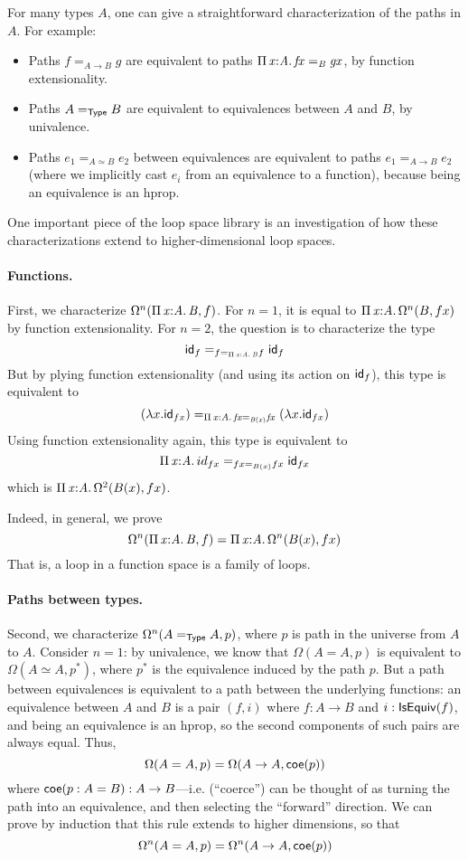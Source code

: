 For many types $A$, one can give a straightforward characterization of
the paths in $A$.  For example:
\begin{itemize}
\item Paths $f =_{A \to B} g$ are equivalent
to paths $\textnormal{$\Pi$}\,\mathit{x} \mathit{:} \mathit{A}.\,\mathit{f x =_B g x}$, by function extensionality.
\item Paths $A
=_{\mathsf{Type}} B$ are equivalent to equivalences between $A$ and $B$, by
univalence.
\item Paths $e_1 =_{A \simeq B} e_2$ between equivalences are equivalent
  to paths $e_1 =_{A \to B} e_2$ (where we implicitly cast $e_i$ from an
  equivalence to a function), because being an equivalence is an hprop.
\end{itemize}

One important piece of the loop space library is an investigation of how
these characterizations extend to higher-dimensional loop spaces.

\paragraph{Functions.}

First, we characterize $\Omega^n(\textnormal{$\Pi$}\,\mathit{x} \mathit{:} \mathit{A}.\,\mathit{B},f)$.  For $n=1$, it is
equal to $\textnormal{$\Pi$}\,\mathit{x} \mathit{:} \mathit{A}.\,\mathit{} \Omega^n(B, f x)$ by function extensionality.
For $n = 2$, the question is to characterize the type
\[
\mathsf{id}_f =_{f =_{\textnormal{$\Pi$}\,\mathit{x} \mathit{:} \mathit{A}.\,\mathit{B}} f} \mathsf{id}_f
\]
But by plying function extensionality (and using its action on $\mathsf{id}_f$), this type
is equivalent to
\[
(\lambda x. \mathsf{id}_{f x}) =_{\textnormal{$\Pi$}\,\mathit{x} \mathit{:} \mathit{A}.\,\mathit{f x =_{B(x)} f x}} (\lambda x. \mathsf{id}_{f x})
\]
Using function extensionality again, this type is equivalent to
\[
\picl{x}{A} \dsd{id}_{f x} =_{f x =_{B(x)} f x} \dsd{id}_{f x}
\]
which is $\textnormal{$\Pi$}\,\mathit{x} \mathit{:} \mathit{A}.\,\mathit{}\Omega^2(B(x), f x)$.  

Indeed, in general, we prove
\[
\Omega^n(\textnormal{$\Pi$}\,\mathit{x} \mathit{:} \mathit{A}.\,\mathit{B},f) = \textnormal{$\Pi$}\,\mathit{x} \mathit{:} \mathit{A}.\,\mathit{}\Omega^n(B(x),f x) 
\]
That is, a loop in a function space is a family of loops.  

\paragraph{Paths between types.}

Second, we characterize $\Omega^n(A =_{\mathsf{Type}} A, p)$, where $p$ is
path in the universe from $A$ to $A$.  Consider $n = 1$: by univalence,
we know that $\Omega(A = A , p)$ is equivalent to $\Omega(A \simeq A, p^*)$,
where $p^*$ is the equivalence induced by the path $p$.  But a path
between equivalences is equivalent to a path between the underlying
functions: an equivalence between $A$ and $B$ is a pair $(f , i)$ where
$f : A \to B$ and $i : \mathsf{IsEquiv}(f)$, and being an equivalence is an
hprop, so the second components of such pairs are always equal.  Thus, 
\[
\Omega(A = A , p) = \Omega(A \to A, \mathsf{coe}(p))
\]
where $\mathsf{coe}(p : A = B) : A \to B$---i.e.  (``coerce'') can be thought
of as turning the path into an equivalence, and then selecting the
``forward'' direction.  We can prove by induction that this rule extends
to higher dimensions, so that 
\[
\Omega^n(A = A , p) = \Omega^n(A \to A, \mathsf{coe}(p))
\]

